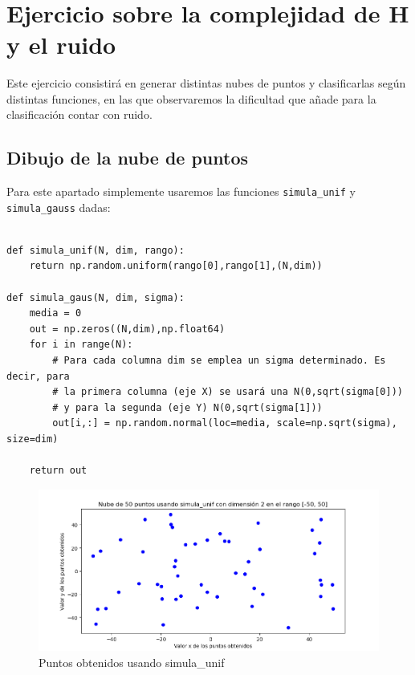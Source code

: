 \documentclass[12pt, spanish]{article}
\makeatletter
\let\thedate\@date
\makeatother
\begin{document}
\begin{titlepage}
    {\large \thedate}\\[0.5cm]
    {\doclicenseThis}
 	
    \vfill
    
\end{titlepage}


\tableofcontents
\pagebreak


\section{Ejercicio sobre la complejidad de H y el ruido}

Este ejercicio consistirá en generar distintas nubes de puntos y clasificarlas según distintas funciones, en las que observaremos la dificultad que añade para la clasificación contar con ruido.

\subsection{Dibujo de la nube de puntos}

Para este apartado simplemente usaremos las funciones \texttt{simula\_unif} y \texttt{simula\_gauss} dadas:

\begin{lstlisting}

def simula_unif(N, dim, rango):
	return np.random.uniform(rango[0],rango[1],(N,dim))

def simula_gaus(N, dim, sigma):
    media = 0
    out = np.zeros((N,dim),np.float64)
    for i in range(N):
        # Para cada columna dim se emplea un sigma determinado. Es decir, para
        # la primera columna (eje X) se usará una N(0,sqrt(sigma[0]))
        # y para la segunda (eje Y) N(0,sqrt(sigma[1]))
        out[i,:] = np.random.normal(loc=media, scale=np.sqrt(sigma), size=dim)

    return out

\end{lstlisting}

\begin{figure}[H]
  \centering
      \includegraphics[scale = 0.70]{ej1-simula_unif.png}
 		 \caption{Puntos obtenidos usando simula\_unif}
  		\label{fig:ej1-1}

\end{figure}
\end{document}
